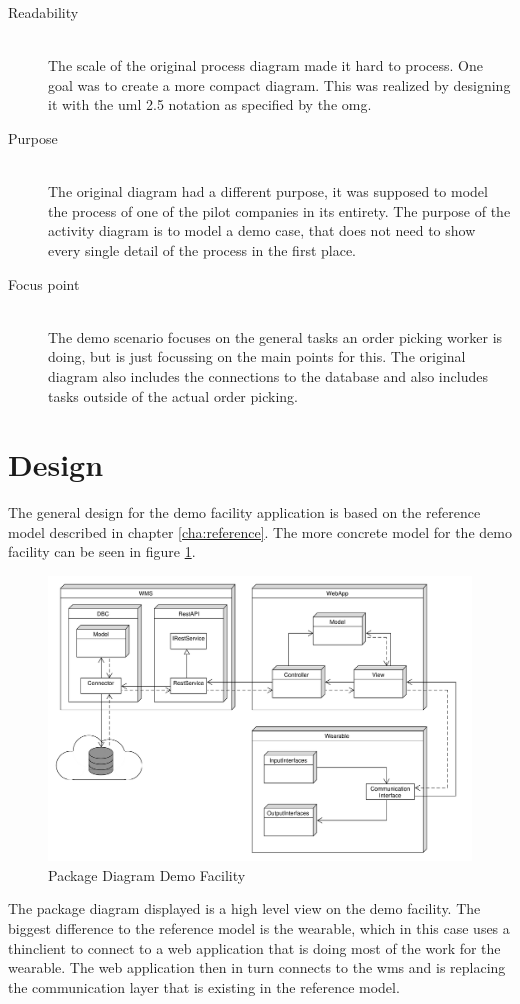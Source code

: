 \begin{description}
	\item[Readability] \hfill \\
	The scale of the original process diagram made it hard to process. One goal was to create a more compact diagram. This was realized by designing it with the \gls{uml} 2.5 notation as specified by the \gls{omg}. \citep{manual:umlnotation}
	\item[Purpose] \hfill \\
	The original diagram had a different purpose, it was supposed to model the process of one of the pilot companies in its entirety. The purpose of the activity diagram is to model a demo case, that does not need to show every single detail of the process in the first place.
	\item[Focus point] \hfill \\
	The demo scenario focuses on the general tasks an order picking worker is doing, but is just focussing on the main points for this. The original diagram also includes the connections to the database and also includes tasks outside of the actual order picking.
\end{description}

\section{Design}
The general design for the demo facility application is based on the reference model described in chapter \ref{cha:reference}. The more concrete model for the demo facility can be seen in figure \ref{fig:ClassDiagramL1}.

\begin{figure}[t]
	\includegraphics[width=\textwidth]{images/ClassDiagram_Level1}
	\caption{Package Diagram Demo Facility}
	\label{fig:ClassDiagramL1}
\end{figure}
The package diagram displayed is a high level view on the demo facility. The biggest difference to the reference model is the wearable, which in this case uses a \gls{thinclient} to connect to a web application that is doing most of the work for the wearable. The web application then in turn connects to the \gls{wms} and is replacing the communication layer that is existing in the reference model.

